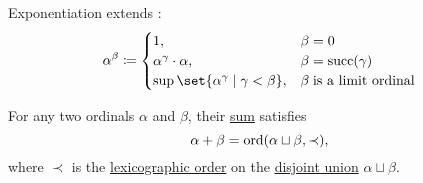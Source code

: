 \begin{definition}
\begin{thmenum}
     Exponentiation extends :
    \begin{equation}\label{eq:def:ordinal_arithmetic/exponentiation}
      \alpha^\beta \coloneqq \begin{cases}
        1,                                               &\beta = 0 \\
        \alpha^\gamma \cdot \alpha,                      &\beta = \op{succ}(\gamma)\\
        \sup\set{ \alpha^\gamma \given \gamma < \beta }, &\beta \T{is a limit ordinal}\\
      \end{cases}
    \end{equation}
  \end{thmenum}
\end{definition}

\begin{proposition}\label{thm:ordinal_addition_disjoin_union}
  For any two ordinals \( \alpha \) and \( \beta \), their \hyperref[def:ordinal_arithmetic/addition]{sum} satisfies
  \begin{equation*}
    \alpha + \beta = \operatorname{ord}(\alpha \sqcup \beta, \prec),
  \end{equation*}
  where \( \prec \) is the \hyperref[def:lexicographic_order]{lexicographic order} on the \hyperref[def:disjoin_union]{disjoint union} \( \alpha \sqcup \beta \).
\end{proposition}



